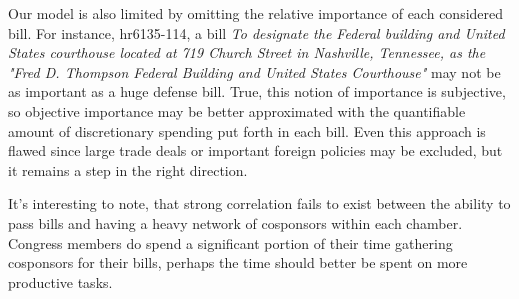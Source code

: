 \documentclass[11pt]{article}
\begin{document}
Our model is also limited by omitting the relative importance of each considered bill. For instance, hr6135-114, a bill \textit{To designate the Federal building and United States courthouse located at 719 Church Street in Nashville, Tennessee, as the "Fred D. Thompson Federal Building and United States Courthouse"} may not be as important as a huge defense bill. True, this notion of importance is subjective, so objective importance may be better approximated with the quantifiable amount of discretionary spending put forth in each bill. Even this approach is flawed since large trade deals or important foreign policies may be excluded, but it remains a step in the right direction.

It's interesting to note, that strong correlation fails to exist between the ability to pass bills and having a heavy network of cosponsors within each chamber. Congress members do spend a significant portion of their time gathering cosponsors for their bills, perhaps the time should better be spent on more productive tasks. 



\end{document}
